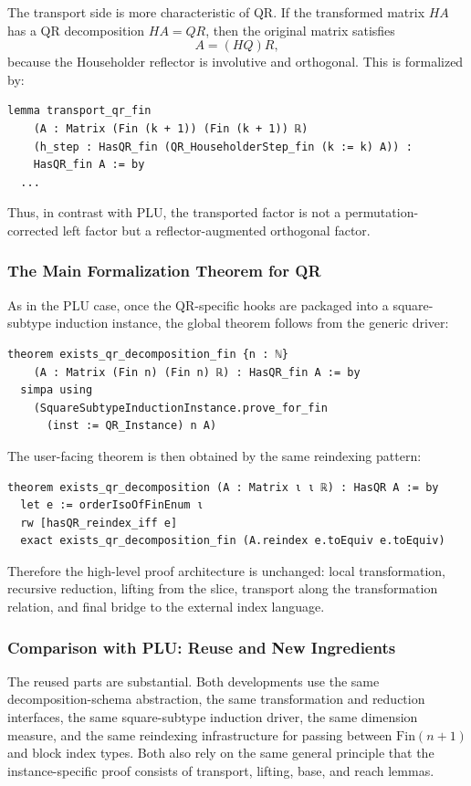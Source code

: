 \documentclass[pdflatex,sn-mathphys-num]{sn-jnl}%
\theoremstyle{thmstyleone}%
\theoremstyle{thmstyletwo}%
\theoremstyle{thmstylethree}%
\begin{document}
The transport side is more characteristic of QR.  If the transformed matrix \(H A\) has a QR decomposition \(H A = Q R\), then the original matrix satisfies
\[
A = (H Q) R,
\]
because the Householder reflector is involutive and orthogonal.  This is formalized by:

\begin{lstlisting}
lemma transport_qr_fin
    (A : Matrix (Fin (k + 1)) (Fin (k + 1)) ℝ)
    (h_step : HasQR_fin (QR_HouseholderStep_fin (k := k) A)) :
    HasQR_fin A := by
  ...
\end{lstlisting}

Thus, in contrast with PLU, the transported factor is not a permutation-corrected left factor but a reflector-augmented orthogonal factor.

\subsubsection{The Main Formalization Theorem for QR}
As in the PLU case, once the QR-specific hooks are packaged into a square-subtype induction instance, the global theorem follows from the generic driver:

\begin{lstlisting}
theorem exists_qr_decomposition_fin {n : ℕ}
    (A : Matrix (Fin n) (Fin n) ℝ) : HasQR_fin A := by
  simpa using
    (SquareSubtypeInductionInstance.prove_for_fin
      (inst := QR_Instance) n A)
\end{lstlisting}

The user-facing theorem is then obtained by the same reindexing pattern:

\begin{lstlisting}
theorem exists_qr_decomposition (A : Matrix ι ι ℝ) : HasQR A := by
  let e := orderIsoOfFinEnum ι
  rw [hasQR_reindex_iff e]
  exact exists_qr_decomposition_fin (A.reindex e.toEquiv e.toEquiv)
\end{lstlisting}

Therefore the high-level proof architecture is unchanged: local transformation, recursive reduction, lifting from the slice, transport along the transformation relation, and final bridge to the external index language.

\subsubsection{Comparison with PLU: Reuse and New Ingredients}
The reused parts are substantial.  Both developments use the same decomposition-schema abstraction, the same transformation and reduction interfaces, the same square-subtype induction driver, the same dimension measure, and the same reindexing infrastructure for passing between \(\mathrm{Fin}(n+1)\) and block index types.  Both also rely on the same general principle that the instance-specific proof consists of transport, lifting, base, and reach lemmas.
\end{document}
